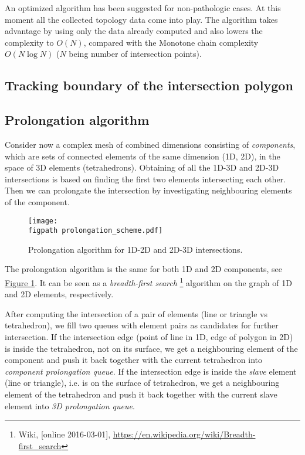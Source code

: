 \documentclass{elsarticle}
\newcommand{\fig}[1]{\hyperref[#1]{Figure \ref{#1}}}
\newcommand{\figpath}{figures/}
\begin{document}
An optimized algorithm has been suggested for non-pathologic cases. At this moment all the collected topology 
data come into play. The algorithm takes advantage by using only the data already computed and also lowers
the complexity to $O(N)$, compared with the Monotone chain complexity $O(N\log N)$ 
($N$ being number of intersection points).


\subsection{Tracking boundary of the intersection polygon}

\subsection{Prolongation algorithm}
Consider now a complex mesh of combined dimensions consisting of \emph{components}, which are sets of connected
elements of the same dimension (1D, 2D), in the space of 3D elements (tetrahedrons). 
Obtaining of all the 1D-3D and 2D-3D intersections is based on finding the first two elements intersecting each other.
Then we can prolongate the intersection by investigating neighbouring elements of the component.
%
\begin{figure}[!htb]
  \centering    
    \texttt{[image: \\figpath prolongation\_scheme.pdf]}
  \caption{Prolongation algorithm for 1D-2D and 2D-3D intersections. }
  \label{fig:prolongation}
\end{figure}

The prolongation algorithm is the same for both 1D and 2D components, see \fig{fig:prolongation}. 
It can be seen as a \emph{breadth-first search}
\footnote{Wiki, [online 2016-03-01], \url{https://en.wikipedia.org/wiki/Breadth-first_search}}
algorithm on the graph of 1D and 2D elements, respectively.

After computing the intersection of a pair of elements (line or triangle vs tetrahedron), we fill
two queues with element pairs as candidates for further intersection. If the intersection edge 
(point of line in 1D, edge of polygon in 2D) is inside the tetrahedron, not on its surface, we
get a neighbouring element of the component and push it back together with the current tetrahedron into 
\emph{component prolongation queue}. If the intersection edge is inside the \emph{slave} element 
(line or triangle), i.e. is on the surface of tetrahedron, we get a neighbouring element of the tetrahedron
and push it back together with the current slave element into \emph{3D prolongation queue}.
\end{document}
